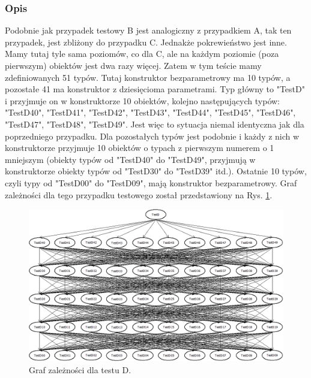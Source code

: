 \documentclass[12pt]{article}
\begin{document}
\subsubsection{Opis}
Podobnie jak przypadek testowy B jest analogiczny z przypadkiem A, tak ten przypadek, jest zbliżony do przypadku C. Jednakże pokrewieństwo jest inne. Mamy tutaj tyle sama poziomów, co dla C, ale na każdym poziomie (poza pierwszym) obiektów jest dwa razy więcej. Zatem w tym teście mamy zdefiniowanych 51 typów. Tutaj konstruktor bezparametrowy ma 10 typów, a pozostałe 41 ma konstruktor z dziesięcioma parametrami. Typ główny to "TestD" i przyjmuje on w konstruktorze 10 obiektów, kolejno następujących typów: "TestD40", "TestD41", "TestD42", "TestD43", "TestD44", "TestD45", "TestD46", "TestD47", "TestD48", "TestD49". Jest więc to sytuacja niemal identyczna jak dla poprzedniego przypadku. Dla pozostałych typów jest podobnie i każdy z nich w konstruktorze przyjmuje 10 obiektów o typach z pierwszym numerem o 1 mniejszym (obiekty typów od "TestD40" do "TestD49", przyjmują w konstruktorze obiekty typów od "TestD30" do "TestD39" itd.). Ostatnie 10 typów, czyli typy od "TestD00" do "TestD09", mają konstruktor bezparametrowy. Graf zależności dla tego przypadku testowego został przedstawiony na Rys. \ref{fig:testD}.\\
\begin{figure}[H]
	\begin{center}
  		\includegraphics[width=\linewidth]{TestD.png}
  		\caption{Graf zależności dla testu D.}
  		\label{fig:testD}
	\end{center}
\end{figure}
\end{document}
